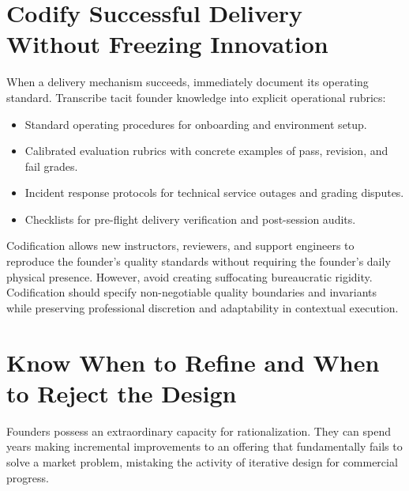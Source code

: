 \section{Codify Successful Delivery Without Freezing Innovation}

When a delivery mechanism succeeds, immediately document its operating standard. Transcribe tacit founder knowledge into explicit operational rubrics:
\begin{itemize}[leftmargin=*]
\item Standard operating procedures for onboarding and environment setup.
\item Calibrated evaluation rubrics with concrete examples of pass, revision, and fail grades.
\item Incident response protocols for technical service outages and grading disputes.
\item Checklists for pre-flight delivery verification and post-session audits.
\end{itemize}

Codification allows new instructors, reviewers, and support engineers to reproduce the founder's quality standards without requiring the founder's daily physical presence. However, avoid creating suffocating bureaucratic rigidity. Codification should specify non-negotiable quality boundaries and invariants while preserving professional discretion and adaptability in contextual execution.

\section{Know When to Refine and When to Reject the Design}

Founders possess an extraordinary capacity for rationalization. They can spend years making incremental improvements to an offering that fundamentally fails to solve a market problem, mistaking the activity of iterative design for commercial progress.

